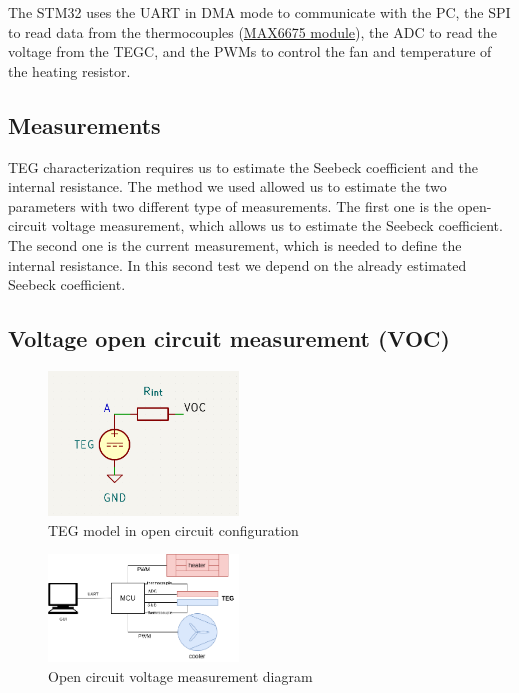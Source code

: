 The STM32 uses the UART in DMA mode to communicate with the PC, the SPI to read data from the thermocouples (\href{https://www.analog.com/media/en/technical-documentation/data-sheets/MAX6675.pdf}{MAX6675 module}), the ADC to read the voltage from the TEGC, and the PWMs to control the fan and temperature of the heating resistor.

\subsection{Measurements}
TEG characterization requires us to estimate the Seebeck coefficient and the internal resistance. The method we used allowed us to estimate the two parameters with two different type of measurements.
The first one is the open-circuit voltage measurement, which allows us to estimate the Seebeck coefficient. The second one is the current measurement, which is needed to define the internal resistance. In this second test we depend on the already estimated Seebeck coefficient.

\subsection{Voltage open circuit measurement (VOC)}
\label{sec:voc-measurement}

\begin{figure}[h]
  \centering
  \includegraphics[width=0.45\textwidth]{assets/VOC_circuit.png}
  \caption{TEG model in open circuit configuration}
  \label{fig:oc_model}
\end{figure}
\begin{figure}[h]
  \centering
  \includegraphics[width=0.45\textwidth]{assets/VOC_schema.png}
  \caption{Open circuit voltage measurement diagram}
\end{figure}

